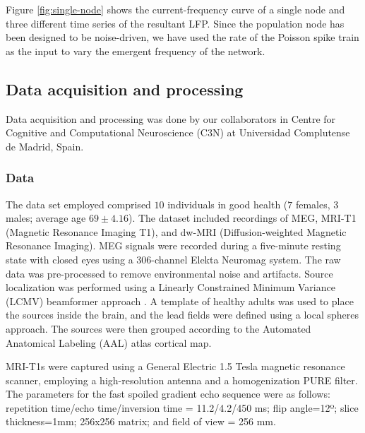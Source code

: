 \documentclass[../main.tex]{subfiles}
\begin{document}
Figure \ref{fig:single-node} shows the current-frequency curve of a single node and three different time series of the resultant LFP.
Since the population node has been designed to be noise-driven, we have used the rate of the Poisson spike train as the input to vary the emergent frequency of the network.

\subsection{Data acquisition and processing}
Data acquisition and processing was done by our collaborators in Centre for Cognitive and Computational Neuroscience (C3N) at Universidad Complutense de Madrid, Spain.
\subsubsection{Data}
The data set employed comprised $10$ individuals in good health ($7$ females, $3$ males; average age $69 \pm 4.16$).
The dataset included recordings of MEG, MRI-T1 (Magnetic Resonance Imaging T1), and dw-MRI (Diffusion-weighted Magnetic Resonance Imaging).
MEG signals were recorded during a five-minute resting state with closed eyes using a 306-channel Elekta Neuromag system.
The raw data was pre-processed to remove environmental noise and artifacts.
Source localization was performed using a Linearly Constrained Minimum Variance (LCMV) beamformer approach \citep{10.1109/tcsii.2006.882228}.
A template of healthy adults was used to place the sources inside the brain, and the lead fields were defined using a local spheres approach.
The sources were then grouped according to the Automated Anatomical Labeling (AAL) atlas cortical map.

MRI-T1s were captured using a General Electric 1.5 Tesla magnetic resonance scanner, employing a high-resolution antenna and a homogenization PURE filter.
The parameters for the fast spoiled gradient echo sequence were as follows: repetition time/echo time/inversion time = 11.2/4.2/450 ms; flip angle=12º; slice thickness=1mm; 256x256 matrix; and field of view = 256 mm.
\end{document}
